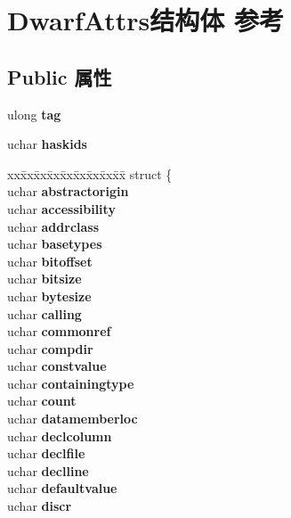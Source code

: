 \hypertarget{struct_dwarf_attrs}{}\section{Dwarf\+Attrs结构体 参考}
\label{struct_dwarf_attrs}
\subsection*{Public 属性}
\begin{DoxyCompactItemize}
\item 
\mbox{\label{struct_dwarf_attrs_a0a2cf71b1da3d7539892cc7b2cfcad0d}} 
ulong {\bfseries tag}
\item 
\mbox{\label{struct_dwarf_attrs_a037054c8797b70d79ee4a2b8cc3cb136}} 
uchar {\bfseries haskids}
\item 
\mbox{\label{struct_dwarf_attrs_ac5471e7a1dcf21f2569259856a05d0d6}} 
\begin{tabbing}
xx\=xx\=xx\=xx\=xx\=xx\=xx\=xx\=xx\=\kill
struct \{\\
\>uchar {\bfseries abstractorigin}\\
\>uchar {\bfseries accessibility}\\
\>uchar {\bfseries addrclass}\\
\>uchar {\bfseries basetypes}\\
\>uchar {\bfseries bitoffset}\\
\>uchar {\bfseries bitsize}\\
\>uchar {\bfseries bytesize}\\
\>uchar {\bfseries calling}\\
\>uchar {\bfseries commonref}\\
\>uchar {\bfseries compdir}\\
\>uchar {\bfseries constvalue}\\
\>uchar {\bfseries containingtype}\\
\>uchar {\bfseries count}\\
\>uchar {\bfseries datamemberloc}\\
\>uchar {\bfseries declcolumn}\\
\>uchar {\bfseries declfile}\\
\>uchar {\bfseries declline}\\
\>uchar {\bfseries defaultvalue}\\
\>uchar {\bfseries discr}\\

\end{tabbing}
\end{DoxyCompactItemize}

